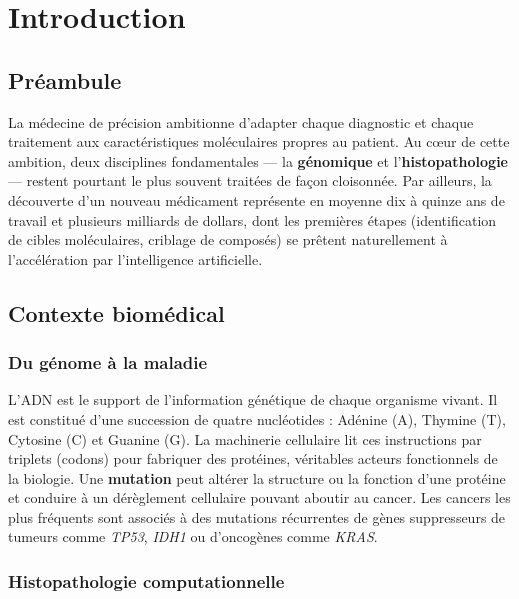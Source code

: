 \documentclass[12pt,a4paper,oneside]{book}
\begin{document}
\mainmatter

\chapter{Introduction}
\label{ch:intro}

\section*{Préambule}
La médecine de précision ambitionne d'adapter chaque diagnostic et chaque
traitement aux caractéristiques moléculaires propres au patient. Au cœur de
cette ambition, deux disciplines fondamentales --- la \textbf{génomique} et
l'\textbf{histopathologie} --- restent pourtant le plus souvent traitées de
façon cloisonnée. Par ailleurs, la découverte d'un nouveau médicament
représente en moyenne dix à quinze ans de travail et plusieurs milliards de
dollars, dont les premières étapes (identification de cibles moléculaires,
criblage de composés) se prêtent naturellement à l'accélération par
l'intelligence artificielle.

\section{Contexte biomédical}

\subsection{Du génome à la maladie}

L'ADN est le support de l'information génétique de chaque organisme vivant.
Il est constitué d'une succession de quatre nucléotides : Adénine (A),
Thymine (T), Cytosine (C) et Guanine (G). La machinerie cellulaire lit ces
instructions par triplets (codons) pour fabriquer des protéines, véritables
acteurs fonctionnels de la biologie. Une \textbf{mutation} peut altérer
la structure ou la fonction d'une protéine et conduire à un dérèglement
cellulaire pouvant aboutir au cancer. Les cancers les plus fréquents sont
associés à des mutations récurrentes de gènes suppresseurs de tumeurs comme
\textit{TP53}, \textit{IDH1} ou d'oncogènes comme \textit{KRAS}.

\subsection{Histopathologie computationnelle}
\end{document}
